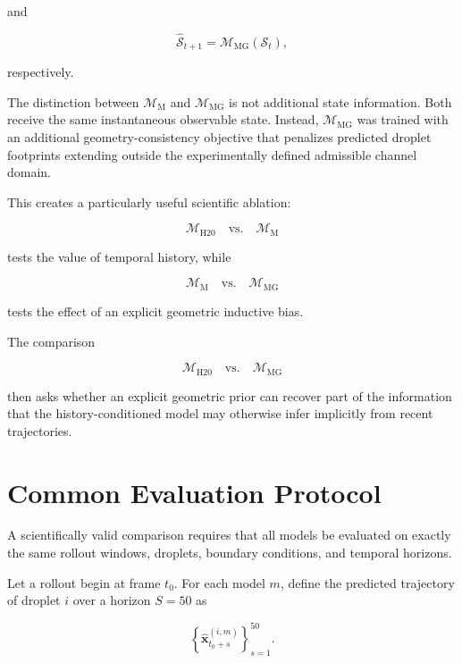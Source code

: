 \documentclass[11pt]{article}
\newcommand{\x}{\mathbf{x}}
\newcommand{\Mhist}{\mathcal{M}_{\mathrm{H20}}}
\newcommand{\Mmark}{\mathcal{M}_{\mathrm{M}}}
\newcommand{\Mgeom}{\mathcal{M}_{\mathrm{MG}}}
\begin{document}
and

\begin{equation}
\hat{\mathcal{S}}_{t+1}
=
\Mgeom
\left(
\mathcal{S}_{t}
\right),
\end{equation}

respectively.

The distinction between \(\Mmark\) and \(\Mgeom\) is not additional state information. Both receive the same instantaneous observable state. Instead, \(\Mgeom\) was trained with an additional geometry-consistency objective that penalizes predicted droplet footprints extending outside the experimentally defined admissible channel domain.

This creates a particularly useful scientific ablation:

\begin{equation}
\Mhist
\quad \text{vs.} \quad
\Mmark
\end{equation}

tests the value of temporal history, while

\begin{equation}
\Mmark
\quad \text{vs.} \quad
\Mgeom
\end{equation}

tests the effect of an explicit geometric inductive bias.

The comparison

\begin{equation}
\Mhist
\quad \text{vs.} \quad
\Mgeom
\end{equation}

then asks whether an explicit geometric prior can recover part of the information that the history-conditioned model may otherwise infer implicitly from recent trajectories.

\section{Common Evaluation Protocol}

A scientifically valid comparison requires that all models be evaluated on exactly the same rollout windows, droplets, boundary conditions, and temporal horizons.

Let a rollout begin at frame \(t_0\). For each model \(m\), define the predicted trajectory of droplet \(i\) over a horizon \(S=50\) as

\begin{equation}
\left\{
\hat{\x}_{t_0+s}^{(i,m)}
\right\}_{s=1}^{50}.
\end{equation}
\end{document}
